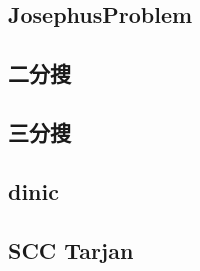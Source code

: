     \subsection{JosephusProblem}
        
    \subsection{二分搜}
    \subsection{三分搜}
    \subsection{dinic}
    \subsection{SCC Tarjan}

